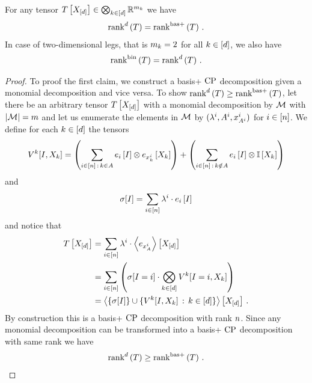 \begin{theorem}
    For any tensor $T\left[X_{[d]}\right]\in\bigotimes_{k\in[d]} \mathbb{R}^{m_{k}}$ we have
    \begin{align*}
         \mathrm{rank}^{d}\left(T\right) = \mathrm{rank}^{\mathrm{bas+}}\left(T\right) \, .
    \end{align*}
    In case of two-dimensional legs, that is $m_{k}=2$ for all $k\in[d]$, we also have
    \begin{align*}
        \mathrm{rank}^{\mathrm{bin}}\left(T\right) = \mathrm{rank}^{d}\left(T\right)  \, .
    \end{align*}
\end{theorem}
\begin{proof}
    To proof the first claim, we construct a basis+ $\mathrm{CP}$ decomposition given a monomial decomposition and vice versa.
    To show $\mathrm{rank}^{d}\left(T\right) \geq \mathrm{rank}^{\mathrm{bas+}}\left(T\right)$, let there be an arbitrary tensor $T\left[X_{[d]}\right]$ with a monomial decomposition by $\mathcal{M}$ with $\left|\mathcal{M}\right|=m$ and let us enumerate the elements in $\mathcal{M}$ by $(\lambda^{i}, A^{i}, x_{A^{i}}^{i})$ for $i\in[n]$.
    We define for each $k\in[d]$ the tensors
    \begin{align*}
        V^{k}[I,X_{k}]
        = \left( \sum_{i\in[n] \, : \, k\in A} e_{i}\left[I\right] \otimes e_{x_{k}^{i}}\left[X_{k}\right] \right)
        + \left(\sum_{i\in[n] \, : \, k\notin A} e_{i}\left[I\right] \otimes \mathbb{I}\left[X_{k}\right] \right)
    \end{align*}
    and
    \begin{align*}
        \sigma[I] = \sum_{i\in[n]} \lambda^{i} \cdot e_{i}\left[I\right]
    \end{align*}
    and notice that
    \begin{align*}
        T\left[X_{[d]}\right]
        & = \sum_{i\in[n]} \lambda^{i} \cdot \left\langle e_{x_{A}^{i}}\right\rangle \left[ X_{[d]} \right] \\
        & = \sum_{i\in[n]} \left(  \sigma[I=i] \cdot \bigotimes_{k\in[d]} V^{k}[I=i, X_{k}] \right) \\
        & = \left\langle 
            \{\sigma[I]\} \cup \{V^{k}[I,X_{k}] \, : \, k\in[d] \}
        \right\rangle \left[ X_{[d]} \right] \, .
    \end{align*}
    By construction this is a basis+ $\mathrm{CP}$ decomposition with rank $n$.
    Since any monomial decomposition can be transformed into a basis+ $\mathrm{CP}$ decomposition with same rank we have
    \begin{align*}
        \mathrm{rank}^{d}\left(T\right) \geq \mathrm{rank}^{\mathrm{bas+}}\left(T\right) \, .
    \end{align*}


\end{proof}

